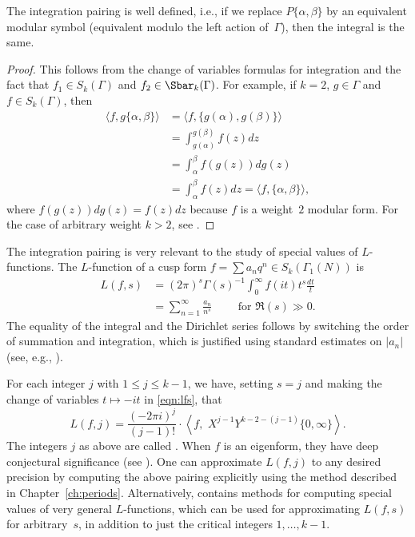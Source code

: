 \begin{proposition}\label{prop:pairwd}
The integration pairing is well defined, i.e., if we
replace $P\{\alpha,\beta\}$ by an equivalent modular symbol
(equivalent modulo the left action of~$\Gamma$), then the integral
is the same.  
\end{proposition}
\begin{proof}
This follows from the change of variables formulas
for integration and the fact that $f_1 \in S_k(\Gamma)$ and
$f_2 \in \Sbar_k(\Gamma)$.  For example, if $k=2$,
$g\in \Gamma$ and $f\in S_k(\Gamma)$, then
\begin{align*}
  \langle f, g\{\alpha,\beta\}\rangle
  &= \langle f, \{g(\alpha),g(\beta)\}\rangle \\
  &= \int_{g(\alpha)}^{g(\beta)} f(z)dz \\
  &= \int_{\alpha}^{\beta} f(g(z))d g(z) \\
  &= \int_{\alpha}^{\beta} f(z)dz  = 
\langle f, \{\alpha, \beta\}\rangle,
\end{align*}
where $f(g(z))d g(z) = f(z) dz$ because
$f$ is a weight~$2$ modular form.
For the case of arbitrary weight $k>2$, see 
.
\end{proof}

The integration pairing is very relevant to the
study of special values of
$L$-functions.  The $L$-function
of a cusp form $f=\sum a_n q^n \in S_k(\Gamma_1(N))$ is
\begin{align}\label{eqn:lfs}
  L(f,s) &= (2\pi)^{s}\Gamma(s)^{-1} \int_{0}^{\infty} f(i t)t^s \frac{dt}{t}\\
&=\sum_{n=1}^{\infty} \frac{a_n}{n^s} \qquad \text{ for }\Re(s)\gg 0.
\end{align}
The equality of the integral and the
Dirichlet series follows 
by switching the order of summation and integration,
which is justified using standard estimates on $|a_n|$
(see, e.g., \cite[Section~VIII.5]{knapp:elliptic}).

For each integer $j$ with $1 \leq j \leq k-1$, we have,
setting $s=j$ and making the change of variables $t\mapsto -it$
in \eqref{eqn:lfs}, that
\begin{equation}\label{eqn:lfunc_ms}
L(f,j) = \frac{(-2\pi i)^{j}}{(j-1)!}
              \cdot \left\langle f,\,\,
       X^{j-1}Y^{k-2-(j-1)} \{0,\infty\} \right\rangle.
   \end{equation}
The integers $j$ as above are called .
When $f$ is an eigenform, they have deep 
conjectural significance (see \cite{bloch-kato, scholl:motivesinvent}).
One can approximate $L(f,j)$ to any desired precision
by computing the above pairing explicitly using
the method described in Chapter~\ref{ch:periods}.
Alternatively, \cite{dokchitser:lfun} contains
methods for computing special values of very 
general $L$-functions, which can be used for
approximating $L(f,s)$ for arbitrary~$s$, in addition
to just the critical integers $1,\ldots,k-1$.

